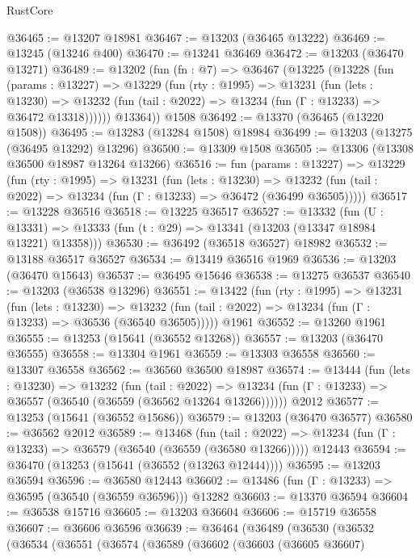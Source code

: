 \begin{lexlean}{RustCore}
\begin{coremodule}
@36465 := @13207 @18981
@36467 := @13203 (@36465 @13222)
@36469 := @13245 (@13246 @400)
@36470 := @13241 @36469
@36472 := @13203 (@36470 @13271)
@36489 := @13202
    (fun (fn : @7) =>
    @36467
      (@13225
        (@13228
          (fun (params : @13227) =>
          @13229
            (fun (rty : @1995) =>
            @13231
              (fun (lets : @13230) =>
              @13232 (fun (tail : @2022) => @13234 (fun (Γ : @13233) => @36472 @13318))))))
        @13364))
    @1508
@36492 := @13370 (@36465 (@13220 @1508))
@36495 := @13283 (@13284 @1508) @18984
@36499 := @13203 (@13275 (@36495 @13292) @13296)
@36500 := @13309 @1508
@36505 := @13306 (@13308 @36500 @18987 @13264 @13266)
@36516 := fun (params : @13227) =>
  @13229
    (fun (rty : @1995) =>
    @13231
      (fun (lets : @13230) =>
      @13232 (fun (tail : @2022) => @13234 (fun (Γ : @13233) => @36472 (@36499 @36505)))))
@36517 := @13228 @36516
@36518 := @13225 @36517
@36527 := @13332
    (fun (U : @13331) => @13333 (fun (t : @29) => @13341 (@13203 (@13347 @18984 @13221) @13358)))
@36530 := @36492 (@36518 @36527) @18982
@36532 := @13188 @36517 @36527
@36534 := @13419 @36516 @1969
@36536 := @13203 (@36470 @15643)
@36537 := @36495 @15646
@36538 := @13275 @36537
@36540 := @13203 (@36538 @13296)
@36551 := @13422
    (fun (rty : @1995) =>
    @13231
      (fun (lets : @13230) =>
      @13232 (fun (tail : @2022) => @13234 (fun (Γ : @13233) => @36536 (@36540 @36505)))))
    @1961
@36552 := @13260 @1961
@36555 := @13253 (@15641 (@36552 @13268))
@36557 := @13203 (@36470 @36555)
@36558 := @13304 @1961
@36559 := @13303 @36558
@36560 := @13307 @36558
@36562 := @36560 @36500 @18987
@36574 := @13444
    (fun (lets : @13230) =>
    @13232
      (fun (tail : @2022) =>
      @13234 (fun (Γ : @13233) => @36557 (@36540 (@36559 (@36562 @13264 @13266))))))
    @2012
@36577 := @13253 (@15641 (@36552 @15686))
@36579 := @13203 (@36470 @36577)
@36580 := @36562 @2012
@36589 := @13468
    (fun (tail : @2022) => @13234 (fun (Γ : @13233) => @36579 (@36540 (@36559 (@36580 @13266)))))
    @12443
@36594 := @36470 (@13253 (@15641 (@36552 (@13263 @12444))))
@36595 := @13203 @36594
@36596 := @36580 @12443
@36602 := @13486 (fun (Γ : @13233) => @36595 (@36540 (@36559 @36596))) @13282
@36603 := @13370 @36594
@36604 := @36538 @15716
@36605 := @13203 @36604
@36606 := @15719 @36558
@36607 := @36606 @36596
@36639 := @36464
    (@36489
      (@36530
        (@36532
          (@36534
            (@36551
              (@36574
                (@36589
                  (@36602
                    (@36603
                      (@36605 @36607)

\end{coremodule}
\end{lexlean}
